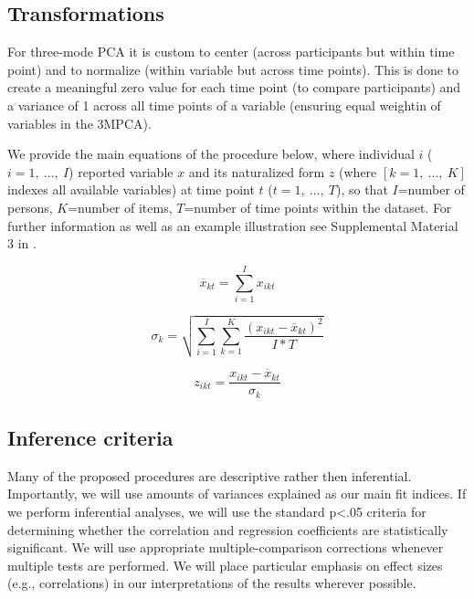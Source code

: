 \documentclass[]{article}
\begin{document}
\hypertarget{transformations}{%
\subsection{Transformations}\label{transformations}}

\setlength{\abovedisplayskip}{0pt}
\setlength{\belowdisplayskip}{0pt}
\setlength{\abovedisplayshortskip}{0pt}
\setlength{\belowdisplayshortskip}{0pt}

For three-mode PCA it is custom to center (across participants but
within time point) and to normalize (within variable but across time
points). This is done to create a meaningful zero value for each time
point (to compare participants) and a variance of 1 across all time
points of a variable (ensuring equal weightin of variables in the
3MPCA).

We provide the main equations of the procedure below, where individual
\(i\) (\(i = 1,\ ...,\ I\)) reported variable \(x\) and its naturalized
form \(z\) (where \([k = 1,\ ...,\ K]\) indexes all available variables)
at time point \(t\) (\(t = 1,\ ...,\ T\)), so that \(I\)=number of
persons, \(K\)=number of items, \(T\)=number of time points within the
dataset. For further information as well as an example illustration see
Supplemental Material 3 in \citet{Monden2015}.

\begin{equation} \label{eq:Mean}
  \overline{x}_{kt} =  \sum_{i=1}^I x_{ikt}
\end{equation}

\begin{equation} \label{eq:NormalizationSd}
  \sigma_{k} =  \sqrt{\sum_{i=1}^I \sum_{k=1}^K \frac{(x_{ikt}-\overline{x}_{kt})^2}{I*T}}
\end{equation}

\begin{equation} \label{eq:NormalizedScore}
  z_{ikt} =  \frac{x_{ikt}-\overline{x}_{kt}}{\sigma_{k}}
\end{equation}

\hypertarget{inference-criteria}{%
\subsection{Inference criteria}\label{inference-criteria}}

Many of the proposed procedures are descriptive rather then inferential.
Importantly, we will use amounts of variances explained as our main fit
indices. If we perform inferential analyses, we will use the standard
p\textless.05 criteria for determining whether the correlation and
regression coefficients are statistically significant. We will use
appropriate multiple-comparison corrections whenever multiple tests are
performed. We will place particular emphasis on effect sizes (e.g.,
correlations) in our interpretations of the results wherever possible.
\end{document}
